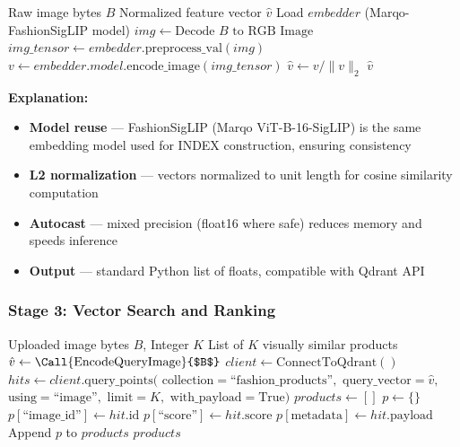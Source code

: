\begin{algorithm}[H]
\caption{Query Image Encoding for Visual Search}\label{alg:encode_query_image}
\begin{algorithmic}[1]
\Require Raw image bytes $B$
\Ensure Normalized feature vector $\hat{v}$
    \State Load $embedder$ (Marqo-FashionSigLIP model)
    \State $img \gets \text{Decode } B \text{ to RGB Image}$
    \State $img\_tensor \gets embedder.\text{preprocess\_val}(img)$
    \State $v \gets embedder.model.\text{encode\_image}(img\_tensor)$
    \State $\hat{v} \gets v / \|v\|_2$ 
    \State \Return $\hat{v}$
\EndFunction
\end{algorithmic}
\end{algorithm}

\textbf{Explanation:}
\begin{itemize}
    \item \textbf{Model reuse} --- FashionSigLIP (Marqo ViT-B-16-SigLIP) is the same embedding model used for INDEX construction, ensuring consistency
    \item \textbf{L2 normalization} --- vectors normalized to unit length for cosine similarity computation
    \item \textbf{Autocast} --- mixed precision (float16 where safe) reduces memory and speeds inference
    \item \textbf{Output} --- standard Python list of floats, compatible with Qdrant API
\end{itemize}

\subsubsection{Stage 3: Vector Search and Ranking}

\begin{algorithm}[H]
\caption{PATH 2 Image-to-Image Vector Search}\label{alg:path2_search}
\begin{algorithmic}[1]
\Require Uploaded image bytes $B$, Integer $K$
\Ensure List of $K$ visually similar products
    \State $\hat{v} \gets \text{\Call{EncodeQueryImage}{$B$}}$ 
    \State $client \gets \text{ConnectToQdrant}()$
    \State $hits \gets client.\text{query\_points}($
    \State \indent $\text{collection} = \text{``fashion\_products''},$
    \State \indent $\text{query\_vector} = \hat{v},$
    \State \indent $\text{using} = \text{``image''},$ 
    \State \indent $\text{limit} = K,$
    \State \indent $\text{with\_payload} = \text{True})$
    \State $products \gets []$
        \State $p \gets \{\}$
        \State $p[\text{``image\_id''}] \gets hit.\text{id}$
        \State $p[\text{``score''}] \gets hit.\text{score}$ 
        \State $p[\text{metadata}] \gets hit.\text{payload}$
        \State Append $p$ to $products$
    \EndFor
    \State \Return $products$
\EndFunction
\end{algorithmic}
\end{algorithm}

